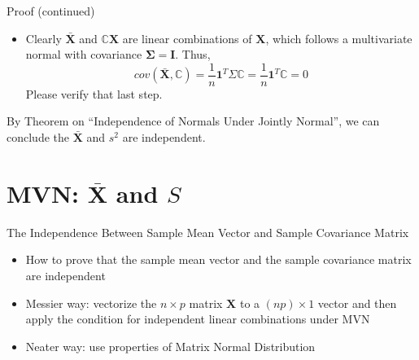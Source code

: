 \documentclass[
  ignorenonframetext,
]{beamer}
\providecommand{\tightlist}{%
  \setlength{\itemsep}{0pt}\setlength{\parskip}{0pt}}
\begin{document}
\begin{frame}{Proof (continued)}
\protect\hypertarget{proof-continued}{}
\begin{itemize}
\tightlist
\item
  Clearly \(\bar {\mathbf X}\) and \(\mathbb C \mathbf X\) are linear
  combinations of \(\mathbf X\), which follows a multivariate normal
  with covariance \(\boldsymbol\Sigma= \mathbf I\). Thus,
  \[cov(\bar {\mathbf X}, \mathbb C) = \frac{1}{n}\mathbf 1^T \Sigma \mathbb C= \frac{1}{n}\mathbf 1^T \mathbb C=0\]
  Please verify that last step.
\end{itemize}

By Theorem on ``Independence of Normals Under Jointly Normal'', we can
conclude the \(\bar {\mathbf X}\) and \(s^2\) are independent.
\end{frame}

\hypertarget{mvn-bar-mathbf-x-and-s}{%
\section{\texorpdfstring{MVN: \(\bar {\mathbf X}\) and
\(S\)}{MVN: \textbackslash bar \{\textbackslash mathbf X\} and S}}\label{mvn-bar-mathbf-x-and-s}}

\begin{frame}{The Independence Between Sample Mean Vector and Sample
Covariance Matrix}
\protect\hypertarget{the-independence-between-sample-mean-vector-and-sample-covariance-matrix}{}
\begin{itemize}
\tightlist
\item
  How to prove that the sample mean vector and the sample covariance
  matrix are independent
\item
  Messier way: vectorize the \(n\times p\) matrix \(\mathbf X\) to a
  \((np)\times 1\) vector and then apply the condition for independent
  linear combinations under MVN
\item
  Neater way: use properties of Matrix Normal Distribution
\end{itemize}
\end{frame}
\end{document}
